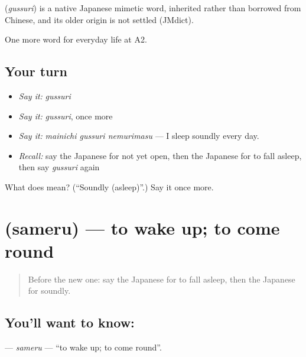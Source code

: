 \begin{cousinweb}
\textbf{} (\emph{gussuri}) is a native Japanese mimetic word, inherited rather than borrowed from Chinese, and its older origin is not settled (JMdict).
\end{cousinweb}

\begin{grammarlens}[title={What you've built}]
One more word for everyday life at A2.
\end{grammarlens}

\subsection*{Your turn}
\begin{itemize}
\raggedright
  \item \emph{Say it:} \emph{gussuri}
  \item \emph{Say it:} \emph{gussuri}, once more
  \item \emph{Say it:} \emph{mainichi gussuri nemurimasu} — I sleep soundly every day.
  \item \emph{Recall:} say the Japanese for not yet open, then the Japanese for to fall asleep, then say \emph{gussuri} again
\end{itemize}

\begin{tcolorbox}[breakable,colback=teal!4,colframe=teal!35!black,title={Before you move on}]
What does  mean? (\textquotedblleft{}Soundly (asleep)\textquotedblright{}.) Say it once more.
\end{tcolorbox}
\section[\texorpdfstring{\ja{さめる} (sameru)}{さめる (sameru)}]{ (sameru) — to wake up; to come round}

\label{lesson:JA-C146-sameru}



\begin{quote}
Before the new one: say the Japanese for to fall asleep, then the Japanese for soundly.
\end{quote}

\subsection*{You'll want to know: }
\textbf{} — \emph{sameru} — \textquotedblleft{}to wake up; to come round\textquotedblright{}.

